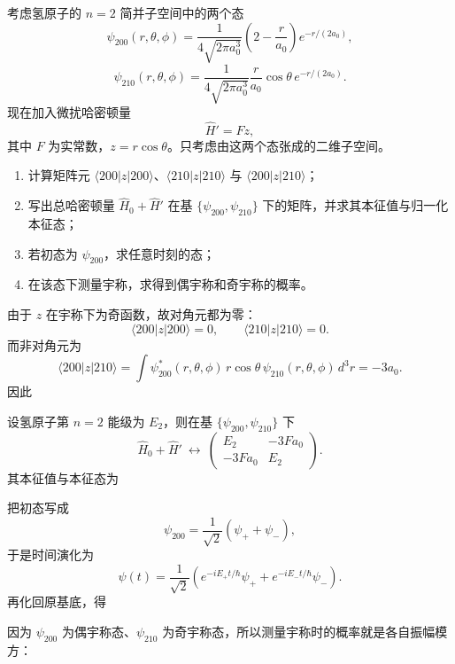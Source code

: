 \begin{question}
考虑氢原子的 $n=2$ 简并子空间中的两个态
\[
\psi_{200}(r,\theta,\phi)=\frac{1}{4\sqrt{2\pi a_0^3}}\left(2-\frac{r}{a_0}\right)e^{-r/(2a_0)},
\]
\[
\psi_{210}(r,\theta,\phi)=\frac{1}{4\sqrt{2\pi a_0^3}}\frac{r}{a_0}\cos\theta\,e^{-r/(2a_0)}.
\]
现在加入微扰哈密顿量
\[
\hat H'=F z,
\]
其中 $F$ 为实常数，$z=r\cos\theta$。只考虑由这两个态张成的二维子空间。

\begin{enumerate}[label=(\arabic*),leftmargin=2.5em]
  \item 计算矩阵元 $\langle 200|z|200\rangle$、$\langle 210|z|210\rangle$ 与 $\langle 200|z|210\rangle$；
  \item 写出总哈密顿量 $\hat H_0+\hat H'$ 在基 $\{\psi_{200},\psi_{210}\}$ 下的矩阵，并求其本征值与归一化本征态；
  \item 若初态为 $\psi_{200}$，求任意时刻的态；
  \item 在该态下测量宇称，求得到偶宇称和奇宇称的概率。
\end{enumerate}

\begin{solution}
由于 $z$ 在宇称下为奇函数，故对角元都为零：
\[
\langle 200|z|200\rangle=0,
\qquad
\langle 210|z|210\rangle=0.
\]
而非对角元为
\[
\langle 200|z|210\rangle
=\int \psi_{200}^*(r,\theta,\phi)\,r\cos\theta\,\psi_{210}(r,\theta,\phi)\,d^3r
=-3a_0.
\]
因此

设氢原子第 $n=2$ 能级为 $E_2$，则在基 $\{\psi_{200},\psi_{210}\}$ 下
\[
\hat H_0+\hat H'\ \longleftrightarrow\ 
\begin{pmatrix}
E_2 & -3Fa_0\\
-3Fa_0 & E_2
\end{pmatrix}.
\]
其本征值与本征态为

把初态写成
\[
\psi_{200}=\frac{1}{\sqrt2}(\psi_++\psi_-),
\]
于是时间演化为
\[
\psi(t)=\frac{1}{\sqrt2}\left(e^{-iE_+ t/\hbar}\psi_++e^{-iE_- t/\hbar}\psi_-\right).
\]
再化回原基底，得

因为 $\psi_{200}$ 为偶宇称态、$\psi_{210}$ 为奇宇称态，所以测量宇称时的概率就是各自振幅模方：
\end{solution}
\end{question}

